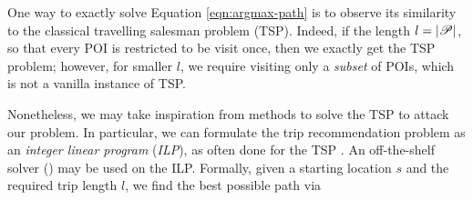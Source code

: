 



One way to exactly solve Equation \ref{eqn:argmax-path}
is to observe its similarity to the classical travelling salesman problem (TSP).
Indeed, if the length $l = |\mathscr{P}|$, so that every POI is restricted to be visit once,
then we exactly get the TSP problem;
however, for smaller $l$, we require visiting only a \emph{subset} of POIs,
which is not a vanilla instance of TSP.

Nonetheless, we may take inspiration from methods to solve the TSP to attack our problem.
In particular, 
we can formulate the trip recommendation problem as an \emph{integer linear program} (\emph{ILP}),
as often done for the TSP \citep{opt98}.
An off-the-shelf solver () may be used on the ILP.
Formally, given a starting location $s$ and the required trip length $l$,
we find the best possible path
via \citep{Chen:2017}


